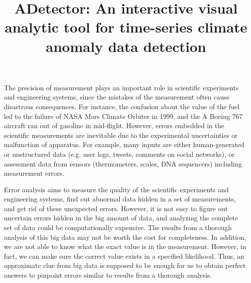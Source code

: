 \documentclass{vgtc}                          %
\title{ADetector: An interactive visual analytic tool for time-series climate anomaly data detection}
\author{Tsung Tai Yeh\thanks{e-mail: yeh14@purdue.edu}\\ %
     \parbox{1.4in} \scriptsize Electrical Computer Engineering Department \\ Purdue University %
\and Shuying Feng\thanks{e-mail:feng98@purdue.edu}\\ %
     \parbox{1.4in}\scriptsize Electrical Computer Engineering Department \\ Purdue University %
}
\begin{document}


\maketitle


The precision of measurement plays an important role in scientific experiments and engineering systems, since the mistakes of the measurement often cause disastrous consequences. For instance, the confusion about the value of the fuel led to the failure of NASA Mars Climate Orbiter in 1999, and the A Boeing 767 aircraft ran out of gasoline in mid-flight\cite{ifan2012}. However, errors embedded in the scientific measurements are inevitable due to the experimental uncertainties or malfunction of apparatus. For example,  many inputs are either human-generated or unstructured data (e.g. user logs, tweets, comments on social networks), or assessment data from sensors (thermometers, scales, DNA sequencers) including measurement errors. 

Error analysis aims to measure the quality of the scientific experiments and engineering systems, find out abnormal data hidden in a set of measurements, and get rid of these unexpected errors. However, it is not easy to figure out uncertain errors hidden in the big amount of data, and analyzing the complete set of data could be computationally expensive. The results from a thorough analysis of this big data may not be worth the cost for completeness. In addition, we are not able to know what the exact value is in the measurement. However, in fact, we can make sure the correct value exists in a specified likelihood\cite{ifan2012}. Thus, an approximate clue from big data is supposed to be enough for us to obtain perfect answers to pinpoint errors similar to results from a thorough analysis.
	
\end{document}
